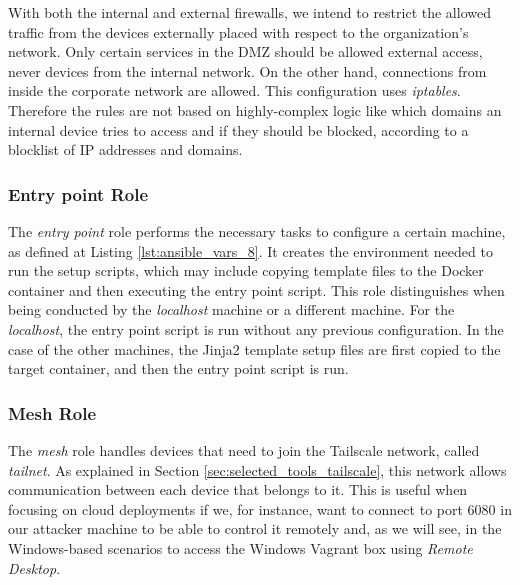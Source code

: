 With both the internal and external firewalls, we intend to restrict the allowed traffic from the devices externally placed with respect to the organization's network. Only certain services in the DMZ should be allowed external access, never devices from the internal network. On the other hand, connections from inside the corporate network are allowed. This configuration uses \textit{iptables}. Therefore the rules are not based on highly-complex logic like which domains an internal device tries to access and if they should be blocked, according to a blocklist of IP addresses and domains.

\subsubsection{Entry point Role} \label{sec:ansible_entrypoint_role}

The \textit{entry point} role performs the necessary tasks to configure a certain machine, as defined at Listing \ref{lst:ansible_vars_8}. It creates the environment needed to run the setup scripts, which may include copying template files to the Docker container and then executing the entry point script. This role distinguishes when being conducted by the \textit{localhost} machine or a different machine. For the \textit{localhost}, the entry point script is run without any previous configuration. In the case of the other machines, the Jinja2 template setup files are first copied to the target container, and then the entry point script is run.

\subsubsection{Mesh Role} \label{sec:ansible_mesh_role}

The \textit{mesh} role handles devices that need to join the Tailscale network, called \textit{tailnet}. As explained in Section \ref{sec:selected_tools_tailscale}, this network allows communication between each device that belongs to it. This is useful when focusing on cloud deployments if we, for instance, want to connect to port 6080 in our attacker machine to be able to control it remotely and, as we will see, in the Windows-based scenarios to access the Windows Vagrant box using \textit{Remote Desktop}.

